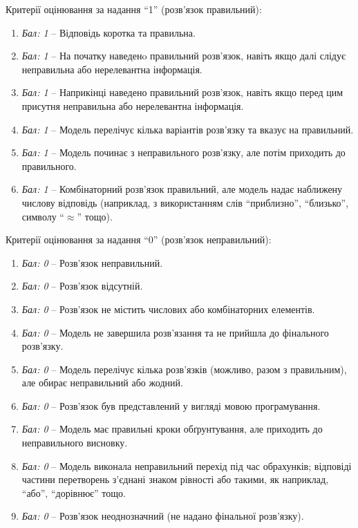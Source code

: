 Критерії оцінювання за надання ``1'' (розв'язок правильний):
\begin{enumerate}
    \item \textit{Бал: 1} -- Відповідь коротка та правильна.
    \item \textit{Бал: 1} -- На початку наведенo правильний розв'язок, навіть якщо далі слідує неправильна або нерелевантна інформація.
    \item \textit{Бал: 1} -- Наприкінці наведено правильний розв'язок, навіть якщо перед цим присутня неправильна або нерелевантна інформація.
    \item \textit{Бал: 1} -- Модель перелічує кілька варіантів розв'язку та вказує на правильний.
    \item \textit{Бал: 1} -- Модель починає з неправильного розв'язку, але потім приходить до правильного.
    \item \textit{Бал: 1} -- Комбінаторний розв'язок правильний, але модель надає наближену числову відповідь (наприклад, з використанням слів ``приблизно'', ``близько'', символу ``\(\approx\)'' тощо).
\end{enumerate}

Критерії оцінювання за надання ``0'' (розв'язок неправильний):
\begin{enumerate}
    \item \textit{Бал: 0} -- Розв'язок неправильний.
    \item \textit{Бал: 0} -- Розв'язок відсутній.
    \item \textit{Бал: 0} -- Розв'язок не містить числових або комбінаторних елементів.
    \item \textit{Бал: 0} -- Модель не завершила розв'язання та не прийшла до фінального розв'язку.
    \item \textit{Бал: 0} -- Модель перелічує кілька розв'язків (можливо, разом з правильним), але обирає неправильний або жодний.
    \item \textit{Бал: 0} -- Розв'язок був представлений у вигляді мовою програмування.
    \item \textit{Бал: 0} -- Модель має правильні кроки обґрунтування, але приходить до неправильного висновку.
    \item \textit{Бал: 0} -- Модель виконала неправильний перехід під час обрахунків; відповіді частини перетворень з'єднані знаком рівності або такими, як наприклад, ``або'', ``дорівнює'' тощо.
    \item \textit{Бал: 0} -- Розв'язок неоднозначний (не надано фінальної розв'язку).
\end{enumerate}

